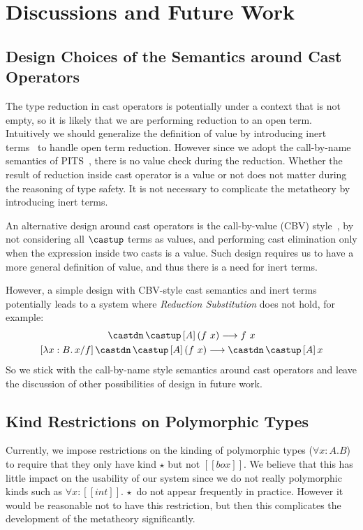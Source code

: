 \section{Discussions and Future Work}

\subsection{Design Choices of the Semantics around Cast Operators}
\label{sec:cast-design}

The type reduction in cast operators is potentially under a context that
is not empty, so it is likely that we are performing reduction to an open term.
Intuitively we should generalize the definition of value by introducing inert
terms~\cite{yang2017unifying} to handle open term reduction.
However since we adopt the call-by-name semantics of PITS~\cite{yang2019pure},
there is no value check during the reduction. Whether the result of reduction
inside cast operator is a value or not does not matter during the reasoning of
type safety. It is not necessary to complicate the metatheory by introducing inert terms.

An alternative design
around cast operators is the call-by-value (CBV) style~\cite{yang2019pure},
by not considering all $\castup$ terms as values, and performing cast elimination only
when the expression inside two casts is a value. Such design requires us to
have a more general definition of value, and thus there is a need for inert terms.

However, a simple design with CBV-style cast semantics and inert terms
potentially leads to a system where \emph{Reduction Substitution} does not hold,
for example:
\begin{gather*}
    \castdn \, \castup \, [A] \, (f ~ x) \longrightarrow f ~ x \\
    [\lambda x : B. \, x / f] \, \castdn \, \castup \, [A] \, (f ~ x) \longrightarrow \castdn \, \castup \, [A] \, x
\end{gather*}
So we stick with the call-by-name style semantics around cast operators and
leave the discussion of other possibilities of design in future work.

\subsection{Kind Restrictions on Polymorphic Types}

Currently, we impose restrictions on the kinding of polymorphic types
($\forall x : A. B$) to require that they only have kind $\star$ but not $[[box]]$.
We believe that this has little impact on the usability
of our system since we do not really polymorphic
kinds such as $\forall x : [[int]].\,\star$ do not appear frequently in practice.
However it would be reasonable not to have this restriction, but then
this complicates the development of the metatheory significantly.

